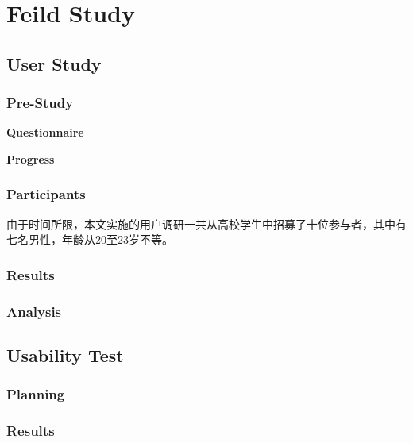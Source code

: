 \chapter{Feild Study}

\section{User Study}

\subsection{Pre-Study}

\textbf{Questionnaire}

\textbf{Progress}

\subsection{Participants}

由于时间所限，本文实施的用户调研一共从高校学生中招募了十位参与者，其中有七名男性，年龄从20至23岁不等。

\subsection{Results}

\subsection{Analysis}

\section{Usability Test}

\subsection{Planning}

\subsection{Results}
